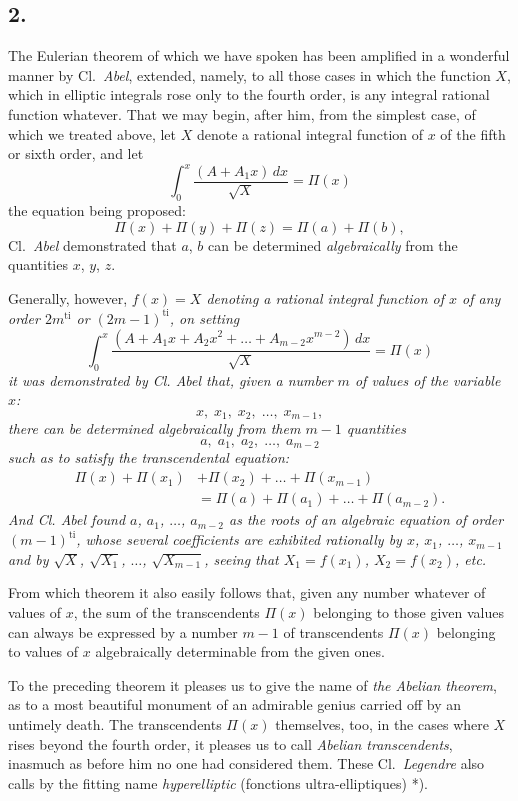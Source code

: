 \documentclass{article}
\begin{document}
\subsection*{2.}

The Eulerian theorem of which we have spoken has been amplified in a wonderful manner by Cl.\ \emph{Abel}, extended, namely, to all those cases in which the function $X$, which in elliptic integrals rose only to the fourth order, is any integral rational function whatever. That we may begin, after him, from the simplest case, of which we treated above, let $X$ denote a rational integral function of $x$ of the fifth or sixth order, and let
\[ \int_0^{x} \frac{(A + A_1 x)\,dx}{\sqrt{X}} = \Pi(x) \]
the equation being proposed:
\[ \Pi(x) + \Pi(y) + \Pi(z) = \Pi(a) + \Pi(b), \]
Cl.\ \emph{Abel} demonstrated that $a$, $b$ can be determined \emph{algebraically} from the quantities $x$, $y$, $z$.

Generally, however, \emph{$f(x) = X$ denoting a rational integral function of $x$ of any order $2m^{\text{ti}}$ or $(2m-1)^{\text{ti}}$, on setting}
\[ \int_0^{x} \frac{(A + A_1 x + A_2 x^{2} + \ldots + A_{m-2}x^{m-2})\,dx}{\sqrt{X}} = \Pi(x) \]
\emph{it was demonstrated by Cl. Abel that, given a number $m$ of values of the variable $x$:}
\[ x, \; x_1, \; x_2, \; \ldots, \; x_{m-1}, \]
\emph{there can be determined algebraically from them $m-1$ quantities}
\[ a, \; a_1, \; a_2, \; \ldots, \; a_{m-2} \]
\emph{such as to satisfy the transcendental equation:}
\[ \begin{aligned} \Pi(x) + \Pi(x_1) &+ \Pi(x_2) + \ldots + \Pi(x_{m-1}) \\ &= \Pi(a) + \Pi(a_1) + \ldots + \Pi(a_{m-2}). \end{aligned} \]
\emph{And Cl. Abel found $a$, $a_1$, $\ldots$, $a_{m-2}$ as the roots of an algebraic equation of order $(m-1)^{\text{ti}}$, whose several coefficients are exhibited rationally by $x$, $x_1$, $\ldots$, $x_{m-1}$ and by $\sqrt{X}$, $\sqrt{X_1}$, $\ldots$, $\sqrt{X_{m-1}}$, seeing that $X_1 = f(x_1)$, $X_2 = f(x_2)$, etc.}

From which theorem it also easily follows that, given any number whatever of values of $x$, the sum of the transcendents $\Pi(x)$ belonging to those given values can always be expressed by a number $m-1$ of transcendents $\Pi(x)$ belonging to values of $x$ algebraically determinable from the given ones.

To the preceding theorem it pleases us to give the name of \emph{the Abelian theorem}, as to a most beautiful monument of an admirable genius carried off by an untimely death. The transcendents $\Pi(x)$ themselves, too, in the cases where $X$ rises beyond the fourth order, it pleases us to call \emph{Abelian transcendents}, inasmuch as before him no one had considered them. These Cl.\ \emph{Legendre} also calls by the fitting name \emph{hyperelliptic} (fonctions ultra-elliptiques) *).
\end{document}
